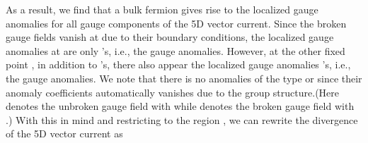 \documentclass[a4paper,12pt]{article}
\begin{document}
As a result, we find that a bulk fermion gives rise to the localized gauge 
anomalies for all gauge components of the 5D vector current.  
Since the broken gauge fields vanish at \coordHE{} due to their
boundary conditions, the localized gauge anomalies 
at \coordHE{} are only \coordHE{}'s, i.e., the \coordHE{} gauge anomalies. 
However, at the other fixed point \coordHE{}, in addition to \coordHE{}'s, 
there also appear the localized gauge 
anomalies \coordHE{}'s, i.e., the \coordHE{} gauge anomalies.  
We note that there is no anomalies of the type \coordHE{} or \coordHE{} 
since their anomaly coefficients automatically vanishes due to the group 
structure.(Here \coordHE{} denotes the unbroken gauge field with \myHighlight{$(+,+)$}\coordHE{} 
while \coordHE{} denotes the broken gauge field with \myHighlight{$(+,-)$}\coordHE{}.)
With this in mind and restricting to the region \myHighlight{$[0,2\pi R)$}\coordHE{}, 
we can rewrite the divergence of the 5D vector current as
\end{document}
